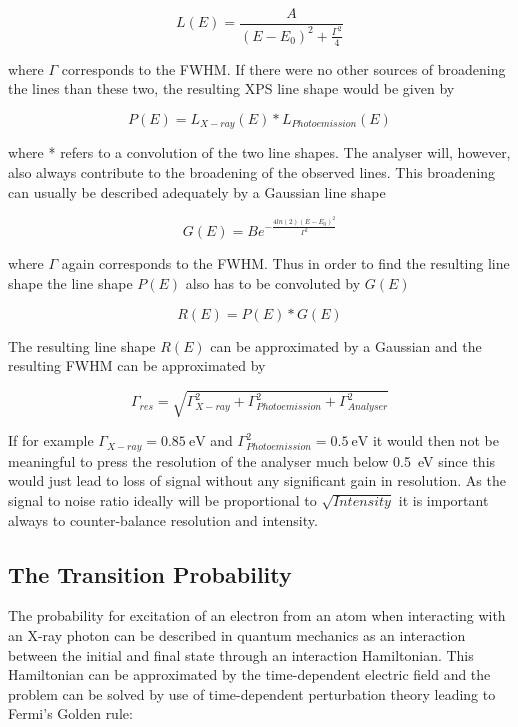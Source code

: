 \begin{equation}
L(E)= \frac{A}{(E-E_0)^2+\frac{\Gamma^2}{4}}
\end{equation}

\noindent where $\Gamma$ corresponds to the FWHM. If there were no other sources of  broadening the lines than these two, the
resulting XPS line shape would be given by

\begin{equation}
P(E)=L_{X-ray}(E)*L_{Photoemission}(E)
\end{equation}
          
\noindent where * refers to a convolution of the two line shapes. The analyser will, however, also always contribute to the broadening of the observed lines. This broadening can usually be described adequately by a Gaussian line shape

\begin{equation}
G(E)=Be^{-\frac{4ln(2)(E-E_0)^2}{\Gamma^2}}
\end{equation}

\noindent where $\Gamma$ again corresponds to the FWHM. Thus in order to find the resulting line shape the line shape $P(E)$ also has  to be convoluted by $G(E)$

\begin{equation}
R(E)=P(E)*G(E)
\end{equation}

The resulting line shape $R(E)$ can be approximated by a Gaussian and the resulting FWHM can be approximated by

\begin{equation}
\Gamma_{res}=\sqrt{\Gamma_{X-ray}^2+\Gamma_{Photoemission}^2+\Gamma_{Analyser}^2}
\end{equation}

If for example $\Gamma_{X-ray}=\SI{0.85}{\electronvolt}$ and $\Gamma_{Photoemission}^{2}=\SI{0.5}{\electronvolt}$ it would then not be meaningful to press the resolution of the  analyser much below \SI{0.5}{\electronvolt} since this would just lead to loss of signal without any significant gain in resolution. As the signal to noise ratio ideally will be proportional to $\sqrt{Intensity}$ it is important always to counter-balance resolution and intensity.

\subsection{The Transition Probability}
The probability for excitation of an electron from an atom when interacting with an X-ray photon can be described in quantum mechanics as an interaction between the initial and final state through an interaction Hamiltonian. This Hamiltonian can be approximated by the time-dependent electric field and the problem can be solved by use of time-dependent perturbation theory leading to Fermi's Golden rule:


